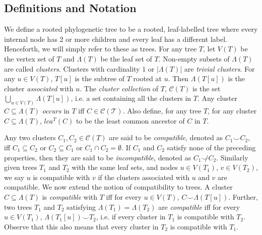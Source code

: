 \documentclass{article}
\newcommand{\compatible}{\smile}
\newcommand{\leafset}{\Lambda}
\begin{document}
    \subsection{Definitions and Notation}
    We define a rooted phylogenetic tree to be a rooted, leaf-labelled tree where every internal node has 2 or more children and every leaf has a different label. Henceforth, we will simply refer to these as trees. For any tree $T$, let $V(T)$ be the vertex set of $T$ and $\leafset(T)$ be the leaf set of $T$. Non-empty subsets of $\leafset(T)$ are called \textit{clusters}. Clusters with cardinality $1$ or $|\leafset(T)|$ are \textit{trivial clusters}. For any $u \in V(T)$, $T[u]$ is the subtree of $T$ rooted at $u$. Then $\leafset(T[u])$ is the cluster \textit{associated} with $u$. The \textit{cluster collection} of $T$, $\mathcal{C}(T)$ is the set $\bigcup_{u \in V(T)} {\leafset(T[u])}$, i.e. a set containing all the clusters in $T$. Any cluster $C \subseteq \leafset(T)$ \textit{occurs} in $T$ iff $C \in \mathcal{C(T)}$. Also define, for any tree $T$, for any cluster $C \subseteq \leafset(T)$, $lca^T(C)$ to be the least common ancestor of $C$ in $T$.

    Any two clusters $C_1, C_2 \in \mathcal{C}(T)$ are said to be \textit{compatible}, denoted as $C_1 \compatible C_2$, iff $C_1 \subseteq C_2$ or $C_2 \subseteq C_1$ or $C_1 \cap C_2 = \emptyset$. If $C_1$ and $C_2$ satisfy none of the preceding properties, then they are said to be \textit{incompatible}, denoted as $C_1 \not\compatible C_2$. Similarly given trees $T_1$ and $T_2$ with the same leaf sets, and nodes $u \in V(T_1)$, $v \in V(T_2)$, we say $u$ is compatible with $v$ if the clusters associated with $u$ and $v$ are compatible. We now extend the notion of compatibility to trees. A cluster $C \subseteq \leafset(T)$ is \textit{compatible} with $T$ iff for every $u \in V(T)$, $C \compatible \leafset(T[u])$. Further, two trees $T_1$ and $T_2$ satisfying $\leafset(T_1) = \leafset(T_2)$ are \textit{compatible} iff for every $u \in V(T_1)$, $\leafset(T_1[u]) \compatible T_2$, i.e. if every cluster in $T_1$ is compatible with $T_2$. Observe that this also means that every cluster in $T_2$ is compatible with $T_1$.
\end{document}
